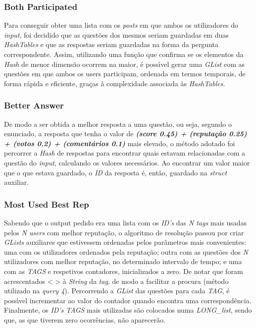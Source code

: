 \documentclass{article}
\begin{document}
\subsubsection{Both Participated}
\par Para conseguir obter uma lista com os \emph{posts} em que ambos os utilizadores do \emph{input}, foi decidido que as quest\~{o}es dos mesmos seriam guardadas em duas \emph{HashTables} e que as respostas seriam guardadas na forma da pergunta correspondente. Assim, utilizando uma fun\c{c}\~{a}o que confirma se os elementos da \emph{Hash} de menor dimens\~{a}o ocorrem na maior, \'{e} poss\'{\i}vel gerar uma \emph{GList} com as quest\~{o}es em que ambos os users participam, ordenada em termos temporais, de forma r\'{a}pida e eficiente, gra\c{c}as \`{a} complexidade associada \`{a}s \emph{HashTables}. 

\subsubsection{Better Answer}
\par De modo a ser obtida a melhor resposta a uma quest\~{a}o, ou seja, segundo o enunciado, a resposta que tenha o valor de \textbf{\emph{(score \texttimes{} 0.45) + (reputa\c{c}\~{a}o \texttimes{} 0.25) + (votos \texttimes{} 0.2) + (coment\'{a}rios \texttimes{} 0.1)}} mais elevado, o m\'{e}todo adotado foi percorrer a \emph{Hash} de respostas para encontrar quais estavam relacionadas com a quest\~{a}o do \emph{input}, calculando os valores necess\'{a}rios. Ao encontrar um valor maior que o que estava guardado, o \emph{ID} da resposta \'{e}, ent\~{a}o, guardado na \emph{struct} auxiliar. 

\subsubsection{Most Used Best Rep}
\par Sabendo que o output pedido era uma lista com os \emph{ID's} das \emph{N tags} mais usadas pelos \emph{N users} com melhor reputa\c{c}\~{a}o, o algoritmo de resolu\c{c}\~{a}o passou por criar \emph{GLists} auxiliares que estivessem ordenadas pelos par\^{a}metros mais convenientes: uma com os utilizadores ordenados pela reputa\c{c}\~{a}o; outra com as quest\~{o}es dos \emph{N} utilizadores com melhor reputa\c{c}\~{a}o, no determinado intervalo de tempo; e uma com as \emph{TAGS} e respetivos contadores, inicializados a zero. De notar que foram acrescentados \textless{} \textgreater{} \`{a} \emph{String} da \emph{tag}, de modo a facilitar a procura (m\'{e}todo utilizado na \emph{query 4}). Percorrendo a \emph{GList} das quest\~{o}es para cada \emph{TAG}, \'{e} poss\'{\i}vel incrementar ao valor do contador quando encontra uma correspond\^{e}ncia. Finalmente, os \emph{ID's} \emph{TAGS} mais utilizadas s\~{a}o colocados numa \emph{LONG\_list}, sendo que, as que tiverem zero ocorr\^{e}ncias, n\~{a}o aparecer\~{a}o.
\end{document}
